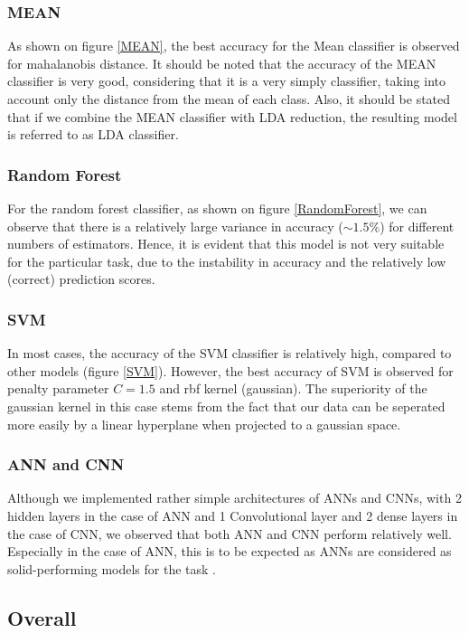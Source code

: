 \documentclass[10pt,journal,compsoc]{IEEEtran}
\begin{document}
\subsubsection{MEAN}
As shown on figure \ref{MEAN}, the best
accuracy for the Mean classifier is observed
for mahalanobis distance.
It should be noted that the accuracy of the
MEAN classifier is very good, considering that
it is a very simply classifier, taking into
account only the distance from the mean of
each class.
Also, it should be stated that if we combine
the MEAN classifier with LDA reduction, the
resulting model is referred to as LDA classifier.

\subsubsection{Random Forest}
For the random forest classifier, as shown on figure \ref{RandomForest},
we can observe that there is a relatively large
variance in accuracy ($\sim1.5\%$) for different
numbers of estimators.
Hence, it is evident that this model is not
very suitable for the particular task, due
to the instability in accuracy and the relatively
low (correct) prediction scores.

\subsubsection{SVM}
In most cases, the accuracy of the SVM classifier
is relatively high, compared to other models (figure \ref{SVM}).
However, the best accuracy of SVM is observed 
for penalty parameter $C=1.5$ and rbf 
kernel (gaussian).
The superiority of the gaussian kernel in this
case stems from the fact that our data can
be seperated more easily by a linear hyperplane when 
projected to a gaussian space\cite{a3}.

\subsubsection{ANN and CNN}
Although we implemented rather simple architectures
of ANNs and CNNs, with 2 hidden layers in the case
of ANN and 1 Convolutional layer and 2 dense layers
in the case of CNN, we observed that
both ANN and CNN perform relatively well.
Especially in the case of ANN, this is to be
expected as ANNs are considered as solid-performing
models for the task \cite{a4}.

\subsection{Overall}
\end{document}
